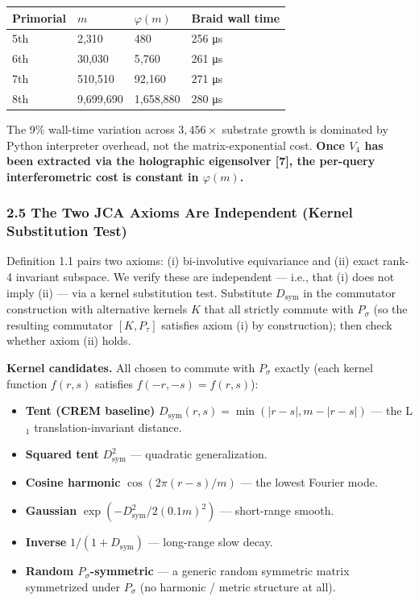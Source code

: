 \documentclass[
]{article}
\newcounter{none} %
\providecommand{\tightlist}{%
  \setlength{\itemsep}{0pt}\setlength{\parskip}{0pt}}
\begin{document}
{\def\LTcaptype{none} %
\begin{longtable}[]{@{}llll@{}}
\toprule\noalign{}
Primorial & \(m\) & \(\varphi(m)\) & Braid wall time \\
\midrule\noalign{}
\endhead
\bottomrule\noalign{}
\endlastfoot
5th & 2,310 & 480 & 256 μs \\
6th & 30,030 & 5,760 & 261 μs \\
7th & 510,510 & 92,160 & 271 μs \\
8th & 9,699,690 & 1,658,880 & 280 μs \\
\end{longtable}
}

The 9\% wall-time variation across \(3{,}456\times\) substrate growth is
dominated by Python interpreter overhead, not the matrix-exponential
cost. \textbf{Once \(V_4\) has been extracted via the holographic
eigensolver {[}7{]}, the per-query interferometric cost is constant in
\(\varphi(m)\).}

\subsubsection{2.5 The Two JCA Axioms Are Independent (Kernel
Substitution
Test)}\label{the-two-jca-axioms-are-independent-kernel-substitution-test}

Definition 1.1 pairs two axioms: (i) bi-involutive equivariance and (ii)
exact rank-4 invariant subspace. We verify these are independent ---
i.e., that (i) does not imply (ii) --- via a kernel substitution test.
Substitute \(D_\text{sym}\) in the commutator construction with
alternative kernels \(K\) that all strictly commute with \(P_\sigma\)
(so the resulting commutator \([K, P_\tau]\) satisfies axiom (i) by
construction); then check whether axiom (ii) holds.

\textbf{Kernel candidates.} All chosen to commute with \(P_\sigma\)
exactly (each kernel function \(f(r,s)\) satisfies
\(f(-r, -s) = f(r, s)\)):

\begin{itemize}
\tightlist
\item
  \textbf{Tent (CREM baseline)}
  \(D_\text{sym}(r,s) = \min(|r-s|, m-|r-s|)\) --- the L\(_1\)
  translation-invariant distance.
\item
  \textbf{Squared tent} \(D_\text{sym}^2\) --- quadratic generalization.
\item
  \textbf{Cosine harmonic} \(\cos(2\pi(r-s)/m)\) --- the lowest Fourier
  mode.
\item
  \textbf{Gaussian} \(\exp(-D_\text{sym}^2 / 2(0.1m)^2)\) ---
  short-range smooth.
\item
  \textbf{Inverse} \(1/(1 + D_\text{sym})\) --- long-range slow decay.
\item
  \textbf{Random \(P_\sigma\)-symmetric} --- a generic random symmetric
  matrix symmetrized under \(P_\sigma\) (no harmonic / metric structure
  at all).
\end{itemize}
\end{document}
